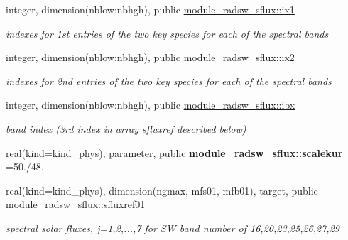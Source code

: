 \begin{Indent}
\begin{DoxyCompactItemize}
\mbox{\label{namespacemodule__radsw__sflux_ac2864b4501e9bc3804d45d14f4aab472}} 
integer, dimension(nblow\+:nbhgh), public \hyperlink{namespacemodule__radsw__sflux_ac2864b4501e9bc3804d45d14f4aab472}{module\+\_\+radsw\+\_\+sflux\+::ix1}
\begin{DoxyCompactList}\small\item\em indexes for 1st entries of the two key species for each of the spectral bands \end{DoxyCompactList}\item 
\mbox{\label{namespacemodule__radsw__sflux_a92703c3e826f7e81267c6b7ae31ebe42}} 
integer, dimension(nblow\+:nbhgh), public \hyperlink{namespacemodule__radsw__sflux_a92703c3e826f7e81267c6b7ae31ebe42}{module\+\_\+radsw\+\_\+sflux\+::ix2}
\begin{DoxyCompactList}\small\item\em indexes for 2nd entries of the two key species for each of the spectral bands \end{DoxyCompactList}\item 
\mbox{\label{namespacemodule__radsw__sflux_acb1498ecf044449dbe6d7a5630fdc375}} 
integer, dimension(nblow\+:nbhgh), public \hyperlink{namespacemodule__radsw__sflux_acb1498ecf044449dbe6d7a5630fdc375}{module\+\_\+radsw\+\_\+sflux\+::ibx}
\begin{DoxyCompactList}\small\item\em band index (3rd index in array sfluxref described below) \end{DoxyCompactList}\item 
\mbox{\label{namespacemodule__radsw__sflux_a2f3280a36f27cea89fc66d71e799cf6d}} 
real(kind=kind\+\_\+phys), parameter, public {\bfseries module\+\_\+radsw\+\_\+sflux\+::scalekur} =50./48.
\item 
\mbox{\label{namespacemodule__radsw__sflux_a84205f359fb3e1a0e1d03e755c52dc78}} 
real(kind=kind\+\_\+phys), dimension(ngmax, mfs01, mfb01), target, public \hyperlink{namespacemodule__radsw__sflux_a84205f359fb3e1a0e1d03e755c52dc78}{module\+\_\+radsw\+\_\+sflux\+::sfluxref01}
\begin{DoxyCompactList}\small\item\em spectral solar fluxes, j=1,2,...,7 for SW band number of 16,20,23,25,26,27,29 \end{DoxyCompactList}\item 

\end{DoxyCompactItemize}
\end{Indent}
